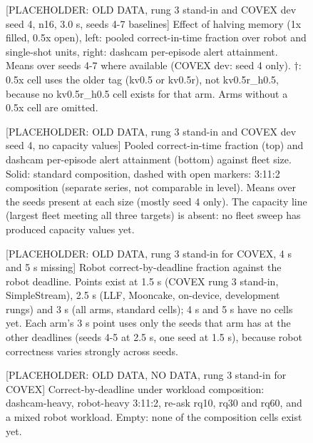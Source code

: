 \documentclass[sigconf]{acmart}
\begin{document}
\clearpage
\begin{figure}[t]
\centering
{\selectfont
}
\caption{[PLACEHOLDER: OLD DATA, rung 3 stand-in and COVEX dev seed 4, n16, 3.0 s, seeds 4-7 baselines] Effect of halving memory (1x filled, 0.5x open), left: pooled correct-in-time fraction over robot and single-shot units, right: dashcam per-episode alert attainment. Means over seeds 4-7 where available (COVEX dev: seed 4 only). $\dagger$: 0.5x cell uses the older tag (kv0.5 or kv0.5r), not kv0.5r\_h0.5, because no kv0.5r\_h0.5 cell exists for that arm. Arms without a 0.5x cell are omitted.}
\label{fig:F08_memory}
\end{figure}
\clearpage
\begin{figure}[t]
\centering
{\selectfont
}
\caption{[PLACEHOLDER: OLD DATA, rung 3 stand-in and COVEX dev seed 4, no capacity values] Pooled correct-in-time fraction (top) and dashcam per-episode alert attainment (bottom) against fleet size. Solid: standard composition, dashed with open markers: 3:11:2 composition (separate series, not comparable in level). Means over the seeds present at each size (mostly seed 4 only). The capacity line (largest fleet meeting all three targets) is absent: no fleet sweep has produced capacity values yet.}
\label{fig:F09_fleet_load}
\end{figure}
\clearpage
\begin{figure}[t]
\centering
{\selectfont
}
\caption{[PLACEHOLDER: OLD DATA, rung 3 stand-in for COVEX, 4 s and 5 s missing] Robot correct-by-deadline fraction against the robot deadline. Points exist at 1.5 s (COVEX rung 3 stand-in, SimpleStream), 2.5 s (LLF, Mooncake, on-device, development rungs) and 3 s (all arms, standard cells); 4 s and 5 s have no cells yet. Each arm's 3 s point uses only the seeds that arm has at the other deadlines (seeds 4-5 at 2.5 s, one seed at 1.5 s), because robot correctness varies strongly across seeds.}
\label{fig:F10_robot_deadline}
\end{figure}
\clearpage
\begin{figure}[t]
\centering
{\selectfont
}
\caption{[PLACEHOLDER: OLD DATA, NO DATA, rung 3 stand-in for COVEX] Correct-by-deadline under workload composition: dashcam-heavy, robot-heavy 3:11:2, re-ask rq10, rq30 and rq60, and a mixed robot workload. Empty: none of the composition cells exist yet.}
\label{fig:F11_composition}
\end{figure}
\end{document}
